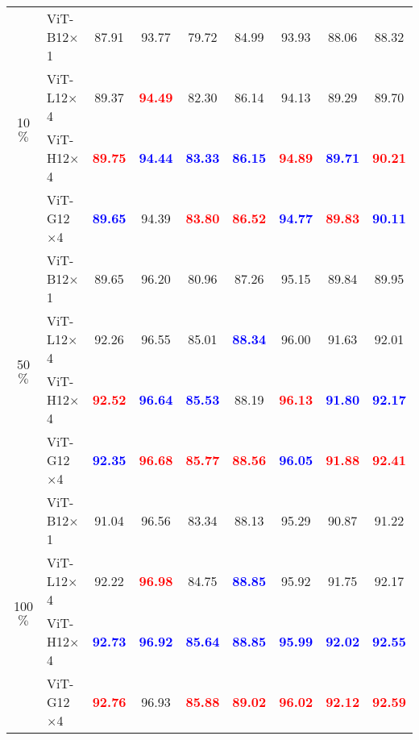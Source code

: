 \begin{table*}[ht]{\textwidth=0mm}
{\begin{tabular}{c | l | c c c c c | c | c }
        \multirow{4}{*}{10$\%$} & ViT-B12$\times$1\cite{wang2022advancing} & 87.91 & 93.77 & 79.72 & 84.99 & 93.93 & 88.06 & 88.32 \\
        & ViT-L12$\times$4 & 89.37 & \textbf{\textcolor{red}{94.49}} & 82.30 & 86.14 & 94.13 & 89.29 & 89.70 \\
        & ViT-H12$\times$4 & \textbf{\textcolor{red}{89.75}} & \textbf{\textcolor{blue}{94.44}} & \textbf{\textcolor{blue}{83.33}} & \textbf{\textcolor{blue}{86.15}} & \textbf{\textcolor{red}{94.89}} & \textbf{\textcolor{blue}{89.71}} & \textbf{\textcolor{red}{90.21}} \\
        & ViT-G12$\times$4 & \textbf{\textcolor{blue}{89.65}} & 94.39 & \textbf{\textcolor{red}{83.80}} & \textbf{\textcolor{red}{86.52}} & \textbf{\textcolor{blue}{94.77}} & \textbf{\textcolor{red}{89.83}} & \textbf{\textcolor{blue}{90.11}} \\ \hline

        \multirow{4}{*}{50$\%$} & ViT-B12$\times$1\cite{wang2022advancing} & 89.65 & 96.20 & 80.96 & 87.26 & 95.15 & 89.84 & 89.95 \\
        & ViT-L12$\times$4 & 92.26 & 96.55 & 85.01 & \textbf{\textcolor{blue}{88.34}} & 96.00 & 91.63 & 92.01 \\
        & ViT-H12$\times$4 & \textbf{\textcolor{red}{92.52}} & \textbf{\textcolor{blue}{96.64}} & \textbf{\textcolor{blue}{85.53}} & 88.19 & \textbf{\textcolor{red}{96.13}} & \textbf{\textcolor{blue}{91.80}} & \textbf{\textcolor{blue}{92.17}} \\
        & ViT-G12$\times$4 & \textbf{\textcolor{blue}{92.35}} & \textbf{\textcolor{red}{96.68}} & \textbf{\textcolor{red}{85.77}} & \textbf{\textcolor{red}{88.56}} & \textbf{\textcolor{blue}{96.05}} & \textbf{\textcolor{red}{91.88}} & \textbf{\textcolor{red}{92.41}} \\ \hline

        \multirow{4}{*}{100$\%$} & ViT-B12$\times$1\cite{wang2022advancing} & 91.04 & 96.56 & 83.34 & 88.13 & 95.29 & 90.87 & 91.22 \\
        & ViT-L12$\times$4 & 92.22 & \textbf{\textcolor{red}{96.98}} & 84.75 & \textbf{\textcolor{blue}{88.85}} & 95.92 & 91.75 & 92.17 \\
        & ViT-H12$\times$4 & \textbf{\textcolor{blue}{92.73}} &\textbf{\textcolor{blue}{ 96.92}} & \textbf{\textcolor{blue}{85.64}} & \textbf{\textcolor{blue}{88.85}} & \textbf{\textcolor{blue}{95.99}} & \textbf{\textcolor{blue}{92.02}} & \textbf{\textcolor{blue}{92.55}} \\
        & ViT-G12$\times$4 & \textbf{\textcolor{red}{92.76}} & 96.93 & \textbf{\textcolor{red}{85.88}} & \textbf{\textcolor{red}{89.02}} & \textbf{\textcolor{red}{96.02}} & \textbf{\textcolor{red}{92.12}} & \textbf{\textcolor{red}{92.59}} \\ \hline



\end{tabular}}
\end{table*}
